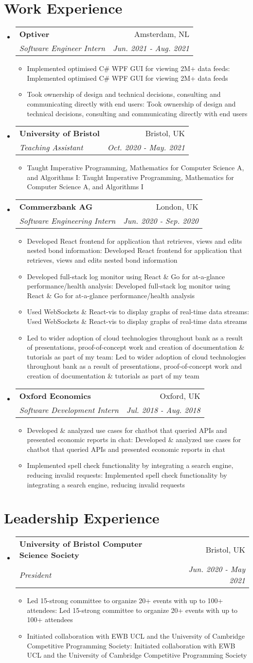 \documentclass[a4paper,11pt]{article}
\makeatletter
\def \ifempty#1{\def\temp{#1} \ifx\temp\empty }
\newcommand{\resumeItem}[2]{
  \item\small{
  	\ifempty{#1}#2\else\textbf{#1}{: #2 \vspace{-2pt}}\fi
  }
}
\newcommand{\resumeSubheading}[4]{
  \vspace{-1pt}\item
    \begin{tabular*}{0.97\textwidth}{l@{\extracolsep{\fill}}r}
      \textbf{#1} & #2 \\
      \textit{\small#3} & \textit{\small #4} \\
    \end{tabular*}\vspace{-5pt}
}
\newcommand{\resumeSubHeadingListStart}{\begin{itemize}[leftmargin=*]}
\newcommand{\resumeSubHeadingListEnd}{\end{itemize}}
\newcommand{\resumeItemListStart}{\begin{itemize}}
\newcommand{\resumeItemListEnd}{\end{itemize}\vspace{-5pt}}
\makeatother
\begin{document}
\section{Work Experience}
  \resumeSubHeadingListStart
    \resumeSubheading
      {Optiver}{Amsterdam, NL}
      {Software Engineer Intern}{Jun. 2021 - Aug. 2021}
      \resumeItemListStart
      	\resumeItem{}
          {Implemented optimised C\# WPF GUI for viewing 2M+ data feeds}
      	\resumeItem{}
          {Took ownership of design and technical decisions, consulting and communicating directly with end users}
      \resumeItemListEnd
    \resumeSubheading
      {University of Bristol}{Bristol, UK}
      {Teaching Assistant}{Oct. 2020 - May. 2021}
      \resumeItemListStart
      	\resumeItem{}
          {Taught Imperative Programming, Mathematics for Computer Science A, and Algorithms I}
      \resumeItemListEnd
    \resumeSubheading
      {Commerzbank AG}{London, UK}
      {Software Engineering Intern}{Jun. 2020 - Sep. 2020}
      \resumeItemListStart
      	\resumeItem{}
          {Developed React frontend for application that retrieves, views and edits nested bond information}
        \resumeItem{}
          {Developed full-stack log monitor using React \& Go for at-a-glance performance/health analysis}
        \resumeItem{}
          {Used WebSockets \& React-vis to display graphs of real-time data streams}
        \resumeItem{}
          {Led to wider adoption of cloud technologies throughout bank as a result of presentations, proof-of-concept work and creation of documentation \& tutorials as part of my team}
      \resumeItemListEnd
    \resumeSubheading
      {Oxford Economics}{Oxford, UK}
      {Software Development Intern}{Jul. 2018 - Aug. 2018}
      \resumeItemListStart
      	\resumeItem{}
          {Developed \& analyzed use cases for chatbot that queried APIs and presented economic reports in chat}
        \resumeItem{}  
          {Implemented spell check functionality by integrating a search 
          engine, reducing invalid requests}
      \resumeItemListEnd
  \resumeSubHeadingListEnd


\section{Leadership Experience}
  \resumeSubHeadingListStart
    \resumeSubheading
      {University of Bristol Computer Science Society}{Bristol, UK}
      {President}{Jun. 2020 - May 2021}
      \resumeItemListStart
        \resumeItem{}
          {Led 15-strong committee to organize 20+ events with up to 100+ attendees}
        \resumeItem{}
          {Initiated collaboration with EWB UCL and the University of Cambridge Competitive Programming Society}
      \resumeItemListEnd
  \resumeSubHeadingListEnd
\end{document}
